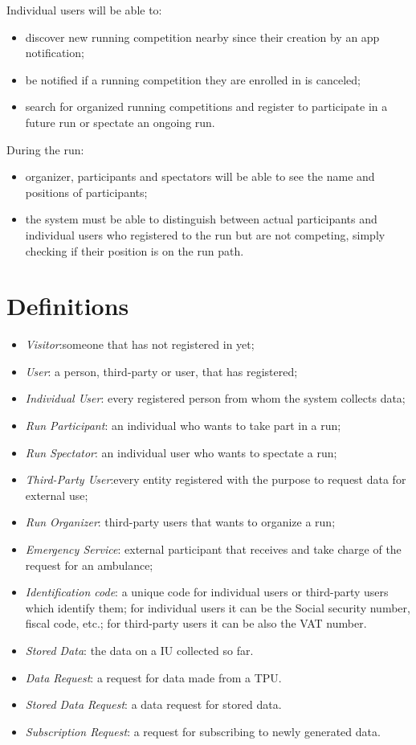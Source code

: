 Individual users will be able to: 
\begin{itemize}
\item 
discover new running competition nearby since their creation by an app notification; 
\item 
be notified if a running competition they are enrolled in is canceled; 
\item 
search for organized running competitions and register to participate in a future run or spectate an ongoing run.
\end{itemize}
During the run: 
\begin{itemize}
\item 
organizer, participants and spectators will be able to see the name and positions of participants; 
\item 
the system must be able to distinguish between actual participants and individual users who registered to the run but are not competing, simply checking if their position is on the run path. 
\end{itemize}

\section{Definitions}
\begin{itemize}
\item \textit{Visitor}:someone that has not registered in yet;
\item \textit{User}: a person, third-party or user, that has registered;
\item \textit{Individual User}: every registered person from whom the system collects data; 
\item \textit{Run Participant}: an individual who wants to take part in a run;
\item \textit{Run Spectator}: an individual user who wants to spectate a run;
\item \textit{Third-Party User}:every entity registered with the purpose to request data for external use;
\item \textit{Run Organizer}: third-party users that wants to organize a run;
\item \textit{Emergency Service}: external participant that receives and take charge of the request for an ambulance;
\item \textit{Identification code}: a unique code for individual users or third-party users which identify them; for individual users it can be the Social security number, fiscal code, etc.; for third-party users it can be also the VAT number.
\item \textit{Stored Data}: the data on a IU collected so far.
\item \textit{Data Request}: a request for data made from a TPU.
\item \textit{Stored Data Request}: a data request for stored data.
\item \textit{Subscription Request}: a request for subscribing to newly generated data.
\end{itemize}
